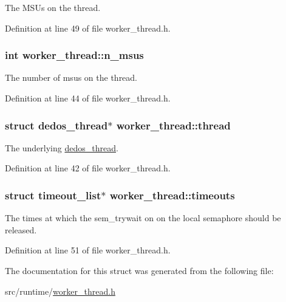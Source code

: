 The M\-S\-Us on the thread. 



Definition at line 49 of file worker\-\_\-thread.\-h.

\hypertarget{structworker__thread_a737618048817673c66abf74b29054796}{
\subsubsection[{n\-\_\-msus}]{\setlength{\rightskip}{0pt plus 5cm}int worker\-\_\-thread\-::n\-\_\-msus}}\label{structworker__thread_a737618048817673c66abf74b29054796}


The number of msus on the thread. 



Definition at line 44 of file worker\-\_\-thread.\-h.

\hypertarget{structworker__thread_a5da2605902d4e02c6c486ed16a76a8df}{
\subsubsection[{thread}]{\setlength{\rightskip}{0pt plus 5cm}struct {\bf dedos\-\_\-thread}$\ast$ worker\-\_\-thread\-::thread}}\label{structworker__thread_a5da2605902d4e02c6c486ed16a76a8df}


The underlying \hyperlink{structdedos__thread}{dedos\-\_\-thread}. 



Definition at line 42 of file worker\-\_\-thread.\-h.

\hypertarget{structworker__thread_a1839face176d6d351d17cd9970396bad}{
\subsubsection[{timeouts}]{\setlength{\rightskip}{0pt plus 5cm}struct {\bf timeout\-\_\-list}$\ast$ worker\-\_\-thread\-::timeouts}}\label{structworker__thread_a1839face176d6d351d17cd9970396bad}


The times at which the sem\-\_\-trywait on on the local semaphore should be released. 



Definition at line 51 of file worker\-\_\-thread.\-h.



The documentation for this struct was generated from the following file\-:\begin{DoxyCompactItemize}
\item 
src/runtime/\hyperlink{worker__thread_8h}{worker\-\_\-thread.\-h}\end{DoxyCompactItemize}
